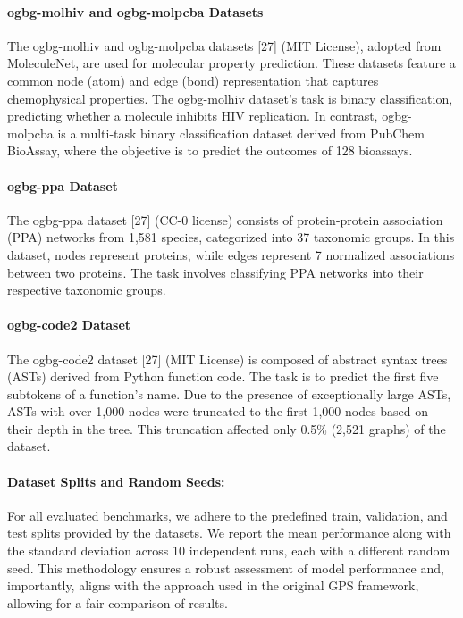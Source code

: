\documentclass{acmart}
\begin{document}
\paragraph{ogbg-molhiv and ogbg-molpcba Datasets}
The ogbg-molhiv and ogbg-molpcba datasets [27] (MIT License), adopted from MoleculeNet, are used for molecular property prediction. These datasets feature a common node (atom) and edge (bond) representation that captures chemophysical properties. The ogbg-molhiv dataset's task is binary classification, predicting whether a molecule inhibits HIV replication. In contrast, ogbg-molpcba is a multi-task binary classification dataset derived from PubChem BioAssay, where the objective is to predict the outcomes of 128 bioassays.

\paragraph{ogbg-ppa Dataset}
The ogbg-ppa dataset [27] (CC-0 license) consists of protein-protein association (PPA) networks from 1,581 species, categorized into 37 taxonomic groups. In this dataset, nodes represent proteins, while edges represent 7 normalized associations between two proteins. The task involves classifying PPA networks into their respective taxonomic groups.

\paragraph{ogbg-code2 Dataset}
The ogbg-code2 dataset [27] (MIT License) is composed of abstract syntax trees (ASTs) derived from Python function code. The task is to predict the first five subtokens of a function’s name. Due to the presence of exceptionally large ASTs, ASTs with over 1,000 nodes were truncated to the first 1,000 nodes based on their depth in the tree. This truncation affected only 0.5\% (2,521 graphs) of the dataset.

\paragraph{Dataset Splits and Random Seeds:}
For all evaluated benchmarks, we adhere to the predefined train, validation, and test splits provided by the datasets. We report the mean performance along with the standard deviation across 10 independent runs, each with a different random seed. This methodology ensures a robust assessment of model performance and, importantly, aligns with the approach used in the original GPS framework, allowing for a fair comparison of results.
\end{document}
